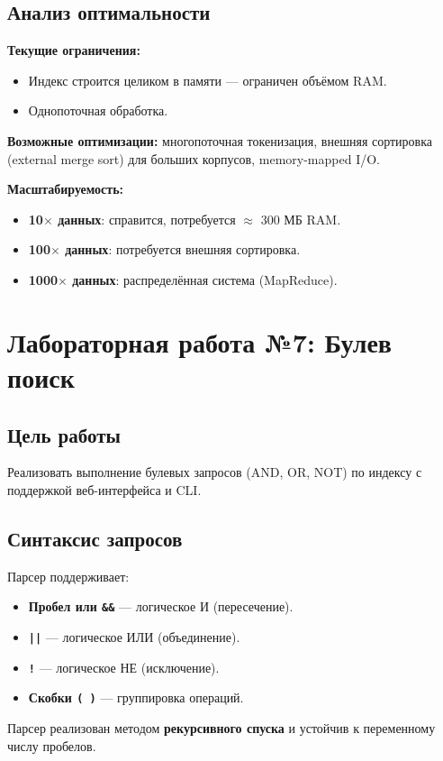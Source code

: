 \documentclass[a4paper,12pt]{article}
\begin{document}
\subsection{Анализ оптимальности}
\textbf{Текущие ограничения:}
\begin{itemize}
    \item Индекс строится целиком в памяти — ограничен объёмом RAM.
    \item Однопоточная обработка.
\end{itemize}

\textbf{Возможные оптимизации:} многопоточная токенизация, внешняя сортировка (external merge sort) для больших корпусов, memory-mapped I/O.

\textbf{Масштабируемость:}
\begin{itemize}
    \item \textbf{10$\times$ данных}: справится, потребуется $\approx$ 300 МБ RAM.
    \item \textbf{100$\times$ данных}: потребуется внешняя сортировка.
    \item \textbf{1000$\times$ данных}: распределённая система (MapReduce).
\end{itemize}

\section{Лабораторная работа №7: Булев поиск}

\subsection{Цель работы}
Реализовать выполнение булевых запросов (AND, OR, NOT) по индексу с поддержкой веб-интерфейса и CLI.

\subsection{Синтаксис запросов}
Парсер поддерживает:
\begin{itemize}
    \item \textbf{Пробел или \texttt{\&\&}} — логическое И (пересечение).
    \item \textbf{\texttt{||}} — логическое ИЛИ (объединение).
    \item \textbf{\texttt{!}} — логическое НЕ (исключение).
    \item \textbf{Скобки \texttt{( )}} — группировка операций.
\end{itemize}
Парсер реализован методом \textbf{рекурсивного спуска} и устойчив к переменному числу пробелов.
\end{document}

